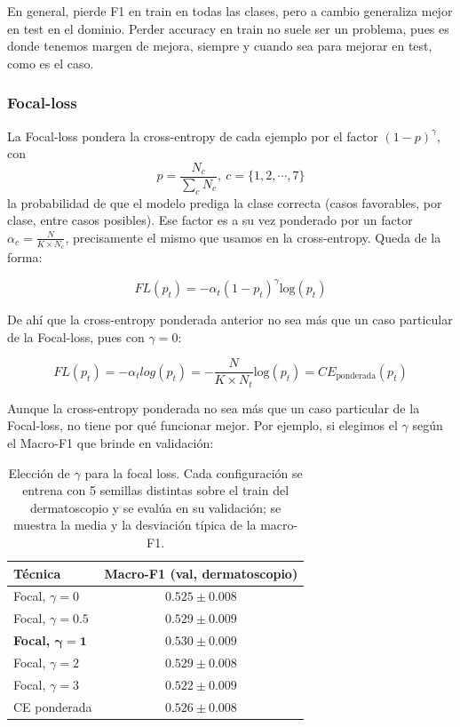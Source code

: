 \documentclass[10pt,a4paper]{article}
\renewcommand{\_}{\guionbajo\allowbreak}
\begin{document}
\noindent En general, pierde F1 en train en todas las clases, pero a cambio generaliza mejor en test en el dominio. Perder accuracy
en train no suele ser un problema, pues es donde tenemos margen de mejora, siempre y cuando sea para mejorar en test, como es el caso. 

\subsubsection{Focal-loss}

\noindent La Focal-loss pondera la cross-entropy de cada ejemplo por el factor $(1-p)^\gamma$, con 
$$p=\frac{N_c}{\sum_c N_c}, \ c=\{1, 2, \cdots, 7\}$$ la probabilidad de que el modelo prediga la clase 
correcta (casos favorables, por clase, entre casos posibles). Ese factor es a su vez ponderado por un factor 
$\alpha_c=\frac{N}{K\times N_c}$, precisamente el mismo que usamos en la cross-entropy. Queda de la forma: 

$$ FL(p_t) = -\alpha_t (1-p_t)^\gamma \text{log}(p_t)$$

\noindent De ahí que la cross-entropy ponderada anterior no sea más que un caso particular de la Focal-loss, pues con
$\gamma=0$:

$$ FL(p_t) = -\alpha_t log(p_t) = - \frac{N}{K\times N_t} \text{log}(p_t) = CE_{\text{ponderada}}(p_t)$$

\noindent Aunque la cross-entropy ponderada no sea más que un caso particular de la Focal-loss, no tiene por qué funcionar mejor. 
Por ejemplo, si elegimos el $\gamma$ según el Macro-F1 que brinde en validación: 

\begin{table}[H]
    \centering
    \small
    \renewcommand{\arraystretch}{1.2}
    \begin{tabular}{@{}lc@{}}
        \toprule
        \textbf{Técnica} & \textbf{Macro-F1 (val, dermatoscopio)} \\
        \midrule
        Focal, $\gamma = 0$          & $0.525 \pm 0.008$ \\
        Focal, $\gamma = 0.5$        & $0.529 \pm 0.009$ \\
        \textbf{Focal, $\boldsymbol{\gamma = 1}$} & $\mathbf{0.530 \pm 0.009}$ \\
        Focal, $\gamma = 2$          & $0.529 \pm 0.008$ \\
        Focal, $\gamma = 3$          & $0.522 \pm 0.009$ \\
        \midrule
        CE ponderada                 & $0.526 \pm 0.008$ \\
        \bottomrule
    \end{tabular}
    \caption{Elección de $\gamma$ para la focal loss. Cada configuración se entrena con 5 semillas distintas sobre el
    train del dermatoscopio y se evalúa en su validación; se muestra la media y la desviación típica de la macro-F1.}
    \label{tab:u3-focal-gamma}
\end{table}
\end{document}
